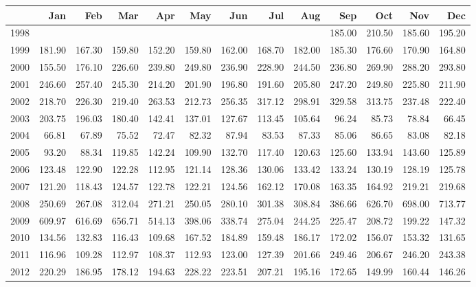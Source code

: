 \begin{longtable}{rrrrrrrrrrrrr}
  \hline
 & Jan & Feb & Mar & Apr & May & Jun & Jul & Aug & Sep & Oct & Nov & Dec \\ 
  \hline
1998 &  &  &  &  &  &  &  &  & 185.00 & 210.50 & 185.60 & 195.20 \\ 
  1999 & 181.90 & 167.30 & 159.80 & 152.20 & 159.80 & 162.00 & 168.70 & 182.00 & 185.30 & 176.60 & 170.90 & 164.80 \\ 
  2000 & 155.50 & 176.10 & 226.60 & 239.80 & 249.80 & 236.90 & 228.90 & 244.50 & 236.80 & 269.90 & 288.20 & 293.80 \\ 
  2001 & 246.60 & 257.40 & 245.30 & 214.20 & 201.90 & 196.80 & 191.60 & 205.80 & 247.20 & 249.80 & 225.80 & 211.90 \\ 
  2002 & 218.70 & 226.30 & 219.40 & 263.53 & 212.73 & 256.35 & 317.12 & 298.91 & 329.58 & 313.75 & 237.48 & 222.40 \\ 
  2003 & 203.75 & 196.03 & 180.40 & 142.41 & 137.01 & 127.67 & 113.45 & 105.64 & 96.24 & 85.73 & 78.84 & 66.45 \\ 
  2004 & 66.81 & 67.89 & 75.52 & 72.47 & 82.32 & 87.94 & 83.53 & 87.33 & 85.06 & 86.65 & 83.08 & 82.18 \\ 
  2005 & 93.20 & 88.34 & 119.85 & 142.24 & 109.90 & 132.70 & 117.40 & 120.63 & 125.60 & 133.94 & 143.60 & 125.89 \\ 
  2006 & 123.48 & 122.90 & 122.28 & 112.95 & 121.14 & 128.36 & 130.06 & 133.42 & 133.24 & 130.19 & 128.19 & 125.78 \\ 
  2007 & 121.20 & 118.43 & 124.57 & 122.78 & 122.21 & 124.56 & 162.12 & 170.08 & 163.35 & 164.92 & 219.21 & 219.68 \\ 
  2008 & 250.69 & 267.08 & 312.04 & 271.21 & 250.05 & 280.10 & 301.38 & 308.84 & 386.66 & 626.70 & 698.00 & 713.77 \\ 
  2009 & 609.97 & 616.69 & 656.71 & 514.13 & 398.06 & 338.74 & 275.04 & 244.25 & 225.47 & 208.72 & 199.22 & 147.32 \\ 
  2010 & 134.56 & 132.83 & 116.43 & 109.68 & 167.52 & 184.89 & 159.48 & 186.17 & 172.02 & 156.07 & 153.32 & 131.65 \\ 
  2011 & 116.96 & 109.28 & 112.97 & 108.37 & 112.93 & 123.00 & 127.39 & 201.66 & 249.46 & 206.67 & 246.20 & 243.38 \\ 
  2012 & 220.29 & 186.95 & 178.12 & 194.63 & 228.22 & 223.51 & 207.21 & 195.16 & 172.65 & 149.99 & 160.44 & 146.26 \\ 

\end{longtable}
